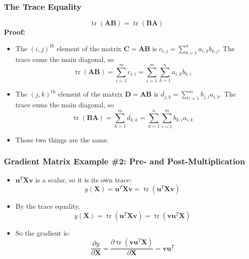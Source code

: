 \documentclass{beamer}
\DeclareMathOperator{\tr}{tr}
\begin{document}
\begin{frame}
  \frametitle{The Trace Equality}
  \begin{displaymath}
    \tr(\mathbf{AB})=\tr(\mathbf{BA})
  \end{displaymath}
  \textbf{Proof:}
  \begin{itemize}
  \item The $(i,j)^{\text{th}}$ element of the matrix
    $\mathbf{C}=\mathbf{A}\mathbf{B}$ is $c_{i,j}=\sum_{k=1}^na_{i,k}b_{k,j}$.
    The trace sums the main diagonal, so
    \begin{displaymath}
      \tr(\mathbf{A}\mathbf{B})=\sum_{i=1}^mc_{i,i}
      =\sum_{i=1}^m\sum_{k=1}^n a_{i,k}b_{k,i}
    \end{displaymath}
  \item The $(j,k)^{\text{th}}$ element of the matrix 
    $\mathbf{D}=\mathbf{A}\mathbf{B}$ is $d_{j,k}=\sum_{i=1}^mb_{j,i}a_{i,k}$.
    The trace sums the main diagonal, so
    \begin{displaymath}
      \tr(\mathbf{B}\mathbf{A})=\sum_{k=1}^md_{k,k}=\sum_{k=1}^n\sum_{i=1}^m b_{k,i}a_{i,k}
    \end{displaymath}
  \item Those two things are the same.
  \end{itemize}
\end{frame}

\begin{frame}
  \frametitle{Gradient Matrix Example \#2: Pre- and Post-Multiplication}
  \begin{itemize}
  \item $\mathbf{u}^T\mathbf{X}\mathbf{v}$ is a scalar, so it is its own trace:
    \begin{displaymath}
      y(\mathbf{X})=\mathbf{u}^T\mathbf{X}\mathbf{v}=
      \tr\left(\mathbf{u}^T\mathbf{X}\mathbf{v}\right)
    \end{displaymath}
  \item By the trace equality,
    \begin{displaymath}
      y(\mathbf{X})=\tr\left(\mathbf{u}^T\mathbf{X}\mathbf{v}\right)=
      \tr\left(\mathbf{v}\mathbf{u}^T\mathbf{X}\right)
    \end{displaymath}
  \item So the gradient is:
    \begin{displaymath}
      \frac{\partial y}{\partial\mathbf{X}}=
      \frac{\partial\tr\left(\mathbf{v}\mathbf{u}^T\mathbf{X}\right)}{\partial\mathbf{X}}
      =
      \mathbf{v}\mathbf{u}^T
    \end{displaymath}
  \end{itemize}
\end{frame}
\end{document}
